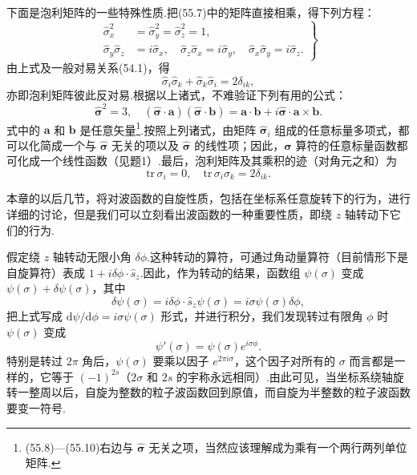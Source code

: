 下面是泡利矩阵的一些特殊性质.把(55.7)中的矩阵直接相乘，得下列方程：
\begin{equation}
\left.\begin{aligned}
  \hat{\sigma}_x^2&=\hat{\sigma}_y^2=\hat{\sigma}_z^2=1,\\
  \hat{\sigma}_y\hat{\sigma}_z&=i\hat{\sigma}_x,\quad
  \hat{\sigma}_z\hat{\sigma}_x=i\hat{\sigma}_y,\quad
  \hat{\sigma}_x\hat{\sigma}_y=i\hat{\sigma}_z.
\end{aligned}\right\}
\end{equation}
由上式及一般对易关系(54.1)，得
\begin{equation}
  \hat{\sigma}_i\hat{\sigma}_k+\hat{\sigma}_k\hat{\sigma}_i=2\delta_{ik},
\end{equation}
亦即泡利矩阵彼此反对易.根据以上诸式，不难验证下列有用的公式：
\begin{equation}
  \hat{\boldsymbol{\sigma}}^2=3,\quad
  (\hat{\boldsymbol{\sigma}}\cdot\boldsymbol{a})(\hat{\boldsymbol{\sigma}}\cdot\boldsymbol{b})
  =\boldsymbol{a}\cdot\boldsymbol{b}
  +i\hat{\boldsymbol{\sigma}}\cdot\boldsymbol{a}\times\boldsymbol{b}.
\end{equation}
式中的 $\boldsymbol{a}$ 和 $\boldsymbol{b}$ 是任意矢量\footnote{(55.8)—(55.10)右边与 $\hat{\boldsymbol{\sigma}}$ 无关之项，当然应该理解成为乘有一个两行两列单位矩阵.}.按照上列诸式，由矩阵 $\hat{\boldsymbol{\sigma}}_i$ 组成的任意标量多项式，都可以化简成一个与 $\hat{\boldsymbol{\sigma}}$ 无关的项以及 $\hat{\boldsymbol{\sigma}}$ 的线性项；因此，$\hat{\boldsymbol{\sigma}}$ 算符的任意标量函数都可化成一个线性函数（见题1）.最后，泡利矩阵及其乘积的迹（对角元之和）为
\begin{equation}
  \mathrm{tr}\,\sigma_i=0,\quad \mathrm{tr}\,\sigma_i\sigma_k=2\delta_{ik}.
\end{equation}

本章的以后几节，将对波函数的自旋性质，包括在坐标系任意旋转下的行为，进行详细的讨论，但是我们可以立刻看出波函数的一种重要性质，即绕 $z$ 轴转动下它们的行为.

假定绕 $z$ 轴转动无限小角 $\delta\phi$.这种转动的算符，可通过角动量算符（目前情形下是自旋算符）表成 $1+i\delta\phi\cdot\hat{s}_z$.因此，作为转动的结果，函数组 $\psi(\sigma)$ 变成 $\psi(\sigma)+\delta\psi(\sigma)$，其中
\begin{equation*}
  \delta\psi(\sigma)=i\delta\phi\cdot\hat{s}_z\psi(\sigma)=i\sigma\psi(\sigma)\delta\phi,
\end{equation*}
把上式写成 $\mathrm{d}\psi/\mathrm{d}\phi=i\sigma\psi(\sigma)$ 形式，并进行积分，我们发现转过有限角 $\phi$ 时 $\psi(\sigma)$ 变成
\begin{equation}
  \psi'(\sigma)=\psi(\sigma)e^{i\sigma\phi}.
\end{equation}
特别是转过 $2\pi$ 角后，$\psi(\sigma)$ 要乘以因子 $e^{2\pi i\sigma}$，这个因子对所有的 $\sigma$ 而言都是一样的，它等于 $(-1)^{2s}$（$2\sigma$ 和 $2s$ 的宇称永远相同）.由此可见，当坐标系绕轴旋转一整周以后，自旋为整数的粒子波函数回到原值，而自旋为半整数的粒子波函数要变一符号.

